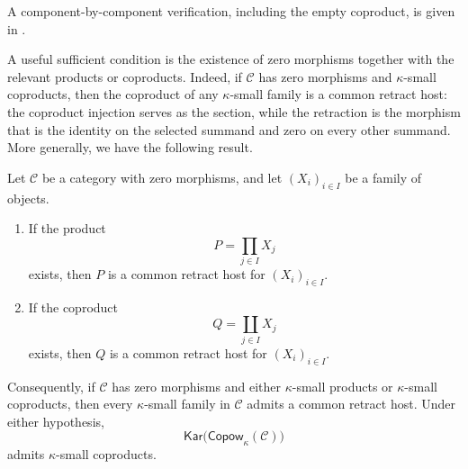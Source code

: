 \documentclass[runningheads,envcountsame]{llncs}
\newcommand{\Copow}{\mathsf{Copow}}
\newcommand{\Kar}{\mathsf{Kar}}
\begin{document}
A component-by-component verification, including the empty coproduct, is given in .





A useful sufficient condition is the existence of zero morphisms together
with the relevant products or coproducts. Indeed, if $\mathcal C$ has zero
morphisms and $\kappa$-small coproducts, then the coproduct of any
$\kappa$-small family is a common retract host: the coproduct injection
serves as the section, while the retraction is the morphism that is the
identity on the selected summand and zero on every other summand. More
generally, we have the following result.

\begin{lemma}
\label{lem:common-hosts-products-coproducts}
Let $\mathcal C$ be a category with zero morphisms, and let
$(X_i)_{i\in I}$ be a family of objects.

\begin{enumerate}
\item If the product
$$
P=\prod_{j\in I}X_j
$$
exists, then $P$ is a common retract host for $(X_i)_{i\in I}$.

\item If the coproduct
$$
Q=\coprod_{j\in I}X_j
$$
exists, then $Q$ is a common retract host for $(X_i)_{i\in I}$.
\end{enumerate}

Consequently, if $\mathcal C$ has zero morphisms and either
$\kappa$-small products or $\kappa$-small coproducts, then every
$\kappa$-small family in $\mathcal C$ admits a common retract host. Under
either hypothesis,
$$
\Kar\bigl(\Copow_\kappa(\mathcal C)\bigr)
$$
admits $\kappa$-small coproducts.
\end{lemma}
\end{document}
